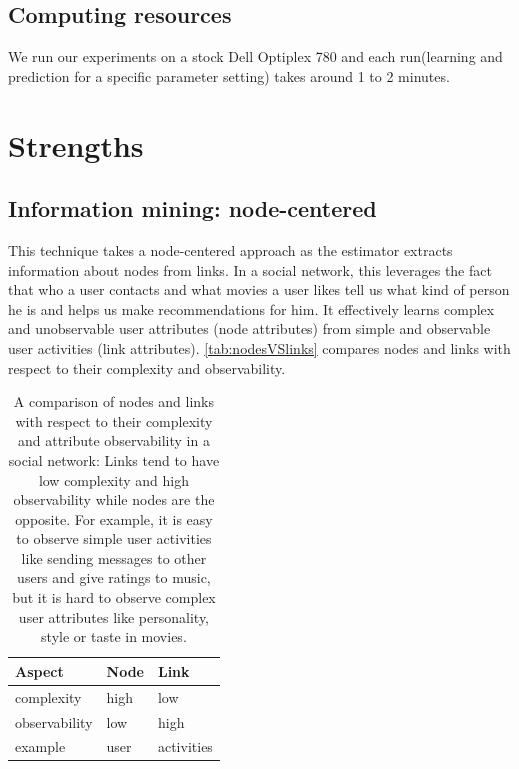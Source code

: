 \documentclass{article}
\begin{document}
\subsection{Computing resources}
We run our experiments on a stock Dell Optiplex 780 and each run(learning and 
prediction for a specific parameter setting) takes around 1 to 2 minutes.

\section{Strengths}

\subsection{Information mining: node-centered}
This technique takes a node-centered approach as the estimator extracts 
information about nodes from links.
In a social network, this leverages the fact that who a user contacts and what 
movies a user likes tell us what kind of person he is and helps us make 
recommendations for him.
It effectively learns complex and unobservable user attributes (node 
attributes) from simple and observable user activities (link attributes). 
\autoref{tab:nodesVSlinks} compares nodes and links with respect to their 
complexity and observability.
\begin{table}[h]
	\centering
	\caption{A comparison of nodes and links with respect to their complexity 
		and attribute observability in a social network:
		Links tend to have low complexity and high observability while nodes 
		are the opposite.
		For example, it is easy to observe simple user activities like sending 
		messages to other users and give ratings to music,
		but it is hard to observe complex user attributes like personality, 
		style or taste in movies.}
	\begin{tabularx}{0.5\textwidth}{ |X|X|X| } \hline
		\textbf{Aspect} & \textbf{Node} & \textbf{Link} \\ \hline
		complexity & high & low \\ \hline
		observability & low & high \\ \hline
		example & user & activities \\ \hline
	\end{tabularx}
	\label{tab:nodesVSlinks}
\end{table}
\end{document}
